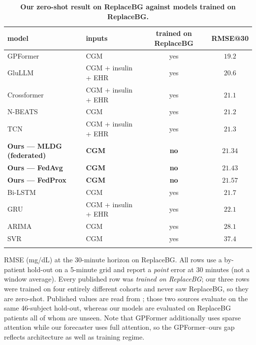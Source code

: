 \documentclass[10pt,letterpaper]{article}
\newlength\savedwidth
\newcommand\thickhline{\noalign{\global\savedwidth\arrayrulewidth\global\arrayrulewidth 2pt}%
\hline
\noalign{\global\arrayrulewidth\savedwidth}}
\begin{document}
\begin{table}[!ht]
\centering
\captionsetup{justification=centering,singlelinecheck=on}
\caption{\bf Our zero-shot result on ReplaceBG against models trained on ReplaceBG.}
\label{tab:oodprior}
\begin{tabular}{llcc}
\thickhline
model & inputs & trained on ReplaceBG & RMSE@30 \\
\hline
GPFormer \cite{zhu2024gpformer}    & CGM                & yes & $19.2$ \\
GluLLM \cite{zhu2026glullm}        & CGM + insulin + EHR & yes & $20.6$ \\
Crossformer \cite{zhu2026glullm}   & CGM + insulin + EHR & yes & $21.1$ \\
N-BEATS \cite{zhu2024gpformer}     & CGM                & yes & $21.2$ \\
TCN \cite{zhu2026glullm}           & CGM + insulin + EHR & yes & $21.3$ \\
\textbf{Ours --- MLDG (federated)} & \textbf{CGM}       & \textbf{no} & $\mathbf{21.34}$ \\
\textbf{Ours --- FedAvg}           & \textbf{CGM}       & \textbf{no} & $\mathbf{21.43}$ \\
\textbf{Ours --- FedProx}          & \textbf{CGM}       & \textbf{no} & $\mathbf{21.57}$ \\
Bi-LSTM \cite{zhu2024gpformer}     & CGM                & yes & $21.7$ \\
GRU \cite{zhu2026glullm}           & CGM + insulin + EHR & yes & $22.1$ \\
ARIMA \cite{zhu2024gpformer}       & CGM                & yes & $28.1$ \\
SVR \cite{zhu2024gpformer}         & CGM                & yes & $37.4$ \\
\thickhline
\end{tabular}
\begin{center}
{\small RMSE (mg/dL) at the 30-minute horizon on ReplaceBG. All rows use a
by-patient hold-out on a 5-minute grid and report a \emph{point} error at 30
minutes (not a window average). Every published row was \emph{trained on
ReplaceBG}; our three rows were trained on four entirely different cohorts and
never saw ReplaceBG, so they are zero-shot. Published values are read from
\cite{zhu2024gpformer,zhu2026glullm}; those two sources evaluate on the same
46-subject hold-out, whereas our models are evaluated on ReplaceBG patients all of
whom are unseen. Note that GPFormer additionally uses sparse attention while our
forecaster uses full attention, so the GPFormer--ours gap reflects architecture as
well as training regime.}
\end{center}
\end{table}
\end{document}
